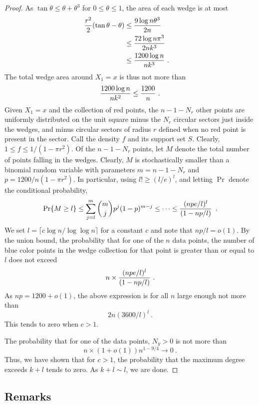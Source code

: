\documentclass[10pt]{llncs}
\newcommand{\PROB}{\Pr}
\begin{document}
\begin{proof}
As $\tan \theta \le \theta + \theta^3$ for $0 \le \theta \le 1$,
the area of each wedge is at most
\[
\begin{aligned}
{ r^2 \over 2} (\tan \theta - \theta)
&\le { 9 \log n \theta^3 \over 2n}  \cr
&\le { 72 \log n \pi^3 \over 2nk^3}  \cr
&\le { 1200 \log n \over n k^3} ~. \cr
\end{aligned}
\]
The total wedge area around $X_1 = x$ is thus not more
than
\[
{ 1200 \log n \over n k^2 } \le { 1200 \over n }~.
\]
Given $X_1 = x$ and the collection of red points,
the $n-1-N_r$ other points are uniformly distributed
on the unit square minus the $N_r$ circular
sectors just inside the wedges, and minus 
circular sectors of radius $r$ defined when no
red point is present in the sector. Call the density $f$
and its support set $S$. Clearly, 
$1 \le f 
\le 1/(1-\pi r^2)$.
Of the $n-1-N_r$ points, let $M$ denote the total
number of points falling in the wedges.
Clearly, $M$ is stochastically smaller
than a binomial random variable with parameters
$m = n-1-N_r$ and $p = 1200/n(1-\pi r^2)$.
In particular, using $l! \ge (l/e)^l$,
and letting $\PROB$ denote the conditional probability,
\[
\PROB \{ M \ge l \}
\le \sum_{j=l}^m {m \choose j} p^j (1-p)^{m-j} 
\le \cdots
\le   {(npe/l)^l \over (1-np/l)} \enspace . 
\]
We set $l = \lceil c \log n / \log \log n \rceil$ for a constant $c$
and note that $np/l = o(1)$.
By the union bound, 
the probability that for one of the $n$ data points,
the number of blue color points in the wedge collection
for that point is greater than or equal to $l$ does not
exceed 
\[
n \times {(npe/l)^l \over (1-np/l)} ~. 
\]
As $np = 1200+o(1)$, the above expression is for all $n$
large enough not more than
\[
2n (3600/l)^l~.
\]
This tends to zero when $c > 1$.

The probability that for one of the data points,
$N_y > 0$ is not more than
\[
n \times (1+o(1)) n^{1-9/4} \to 0~.
\]
Thus, we have shown that for $c > 1$, 
the probability that the maximum degree
exceeds $k+l$ tends to zero. As $k+l \sim l$, we are done.
\end{proof}

\subsection{Remarks}
\end{document}
